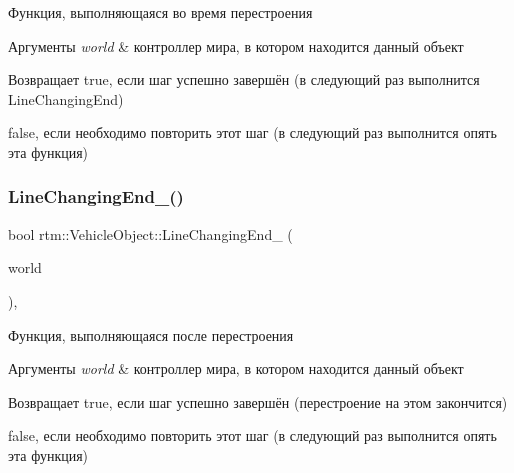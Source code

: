 Функция, выполняющаяся во время перестроения 
\begin{DoxyParams}{Аргументы}
{\em world} & контроллер мира, в котором находится данный объект \\
\hline
\end{DoxyParams}
\begin{DoxyReturn}{Возвращает}
true, если шаг успешно завершён (в следующий раз выполнится Line\+Changing\+End) 

false, если необходимо повторить этот шаг (в следующий раз выполнится опять эта функция) 
\end{DoxyReturn}
\mbox{\label{classrtm_1_1_vehicle_object_a61c3ec3ea6a03c4c031c2b72def10c72}} 
\subsubsection{\texorpdfstring{Line\+Changing\+End\+\_\+()}{LineChangingEnd\_()}}
{\footnotesize\ttfamily bool rtm\+::\+Vehicle\+Object\+::\+Line\+Changing\+End\+\_\+ (\begin{DoxyParamCaption}\item[{\hyperlink{classrtm_1_1_world_controller}{World\+Controller} $\ast$const}]{world }\end{DoxyParamCaption})\hspace{0.3cm}{\ttfamily [protected]}, {\ttfamily [virtual]}}

Функция, выполняющаяся после перестроения 
\begin{DoxyParams}{Аргументы}
{\em world} & контроллер мира, в котором находится данный объект \\
\hline
\end{DoxyParams}
\begin{DoxyReturn}{Возвращает}
true, если шаг успешно завершён (перестроение на этом закончится) 

false, если необходимо повторить этот шаг (в следующий раз выполнится опять эта функция) 
\end{DoxyReturn}
\mbox{\label{classrtm_1_1_vehicle_object_afbfb4168caaa0b61ff8cc18e0b52275c}} 
